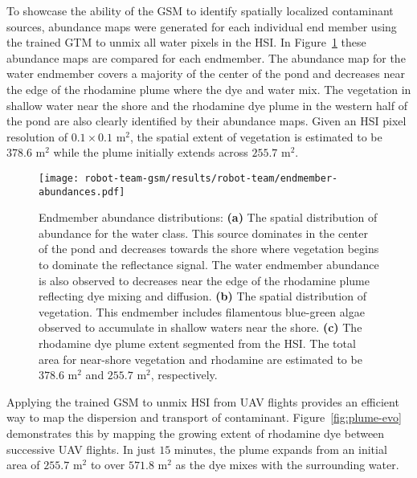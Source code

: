 To showcase the ability of the GSM to identify spatially localized contaminant
sources, abundance maps were generated for each individual end member using the
trained GTM to unmix all water pixels in the HSI. In
Figure~\ref{fig:endmember-abundance-dist} these abundance maps are compared for
each endmember. The abundance map for the water endmember covers a majority of
the center of the pond and decreases near the edge of the rhodamine plume where
the dye and water mix. The vegetation in shallow water near the shore and the
rhodamine dye plume in the western half of the pond are also clearly identified
by their abundance maps. Given an HSI pixel resolution of $0.1 \times 0.1$
$\text{m}^2$, the spatial extent of vegetation is estimated to be $378.6$
$\text{m}^2$ while the plume initially extends across $255.7$ $\text{m}^2$.


\newpage

\begin{figure}[H]
  \vspace{-1.5cm}
  \centering
  \texttt{[image: robot-team-gsm/results/robot-team/endmember-abundances.pdf]}
  \caption{Endmember abundance distributions: \textbf{(a)} The spatial
    distribution of abundance for the water class. This source dominates in the
    center of the pond and decreases towards the shore where vegetation begins
    to dominate the reflectance signal. The water endmember abundance is also
    observed to decreases near the edge of the rhodamine plume reflecting dye
    mixing and diffusion. \textbf{(b)} The spatial distribution of vegetation.
    This endmember includes filamentous blue-green algae observed to accumulate
    in shallow waters near the shore. \textbf{(c)} The rhodamine dye plume
    extent segmented from the HSI. The total area for near-shore vegetation and
    rhodamine are estimated to be $378.6$ $\text{m}^2$ and $255.7$ $\text{m}^2$,
    respectively.}
  \label{fig:endmember-abundance-dist}
\end{figure}


Applying the trained GSM to unmix HSI from UAV flights provides an efficient way
to map the dispersion and transport of contaminant. Figure~\ref{fig:plume-evo}
demonstrates this by mapping the growing extent of rhodamine dye between
successive UAV flights. In just $15$ minutes, the plume expands from an initial
area of $255.7$ $\text{m}^2$ to over $571.8$ $\text{m}^2$ as the dye mixes with
the surrounding water.


\clearpage
\newpage

